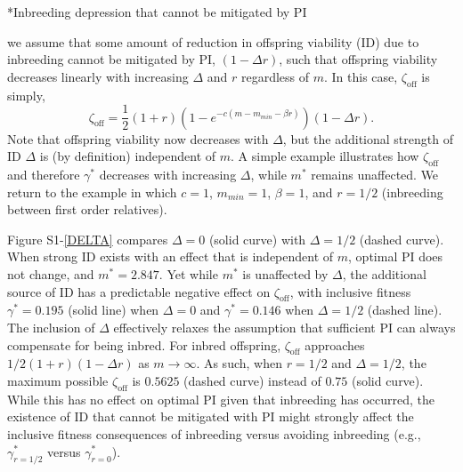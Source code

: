 \documentclass[12pt]{article}
\makeatletter
\renewcommand\section{\@startsection{section}{1}{0in}{-0.5\baselineskip}{0.1\baselineskip}{\normalfont\large\bfseries}}
\makeatother
\begin{document}
\clearpage

\section*{Inbreeding depression that cannot be mitigated by PI}

 we assume that some amount of reduction in offspring viability (ID) due to inbreeding cannot be mitigated by PI, $(1 - \Delta r)$, such that offspring viability decreases linearly with increasing $\Delta$ and $r$ regardless of $m$. In this case, $\zeta_{\textrm{off}}$ is simply,
\begin{equation}
\zeta_{\textrm{off}} = \frac{1}{2}\left(1+r\right)\left(1-e^{-c\left(m-m_{min}-\beta r\right)}\right) \left(1 - \Delta r\right).
\end{equation}
Note that offspring viability now decreases with $\Delta$, but the additional strength of ID $\Delta$ is (by definition) independent of $m$. A simple example illustrates how $\zeta_{\textrm{off}}$ and therefore $\gamma^{*}$ decreases with increasing $\Delta$, while $m^{*}$ remains unaffected. We return to the example in which $c=1$, $m_{min}=1$, $\beta=1$, and $r=1/2$ (inbreeding between first order relatives).

Figure S1-\ref{DELTA} compares $\Delta=0$ (solid curve) with $\Delta=1/2$ (dashed curve). When strong ID exists with an effect that is independent of $m$, optimal PI does not change, and $m^{*}=2.847$. Yet while $m^{*}$ is unaffected by $\Delta$, the additional source of ID has a predictable negative effect on $\zeta_{\textrm{off}}$, with inclusive fitness $\gamma^{*}=0.195$ (solid line) when $\Delta=0$ and $\gamma^{*}=0.146$ when $\Delta=1/2$ (dashed line). The inclusion of $\Delta$ effectively relaxes the assumption that sufficient PI can always compensate for being inbred. For inbred offspring, $\zeta_{\textrm{off}}$ approaches $1/2(1+r)(1 - \Delta r)$ as $m \to \infty$. As such, when $r=1/2$ and $\Delta=1/2$, the maximum possible $\zeta_{\textrm{off}}$ is $0.5625$ (dashed curve) instead of $0.75$ (solid curve). While this has no effect on optimal PI given that inbreeding has occurred, the existence of ID that cannot be mitigated with PI might strongly affect the inclusive fitness consequences of inbreeding versus avoiding inbreeding (e.g., $\gamma^{*}_{r=1/2}$ versus $\gamma^{*}_{r=0}$).
\end{document}
